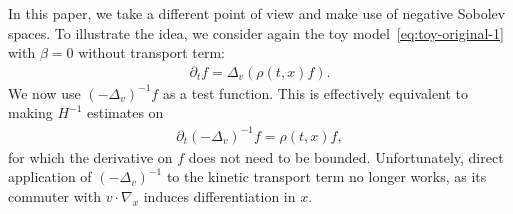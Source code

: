 \documentclass[11pt,american, reqno]{amsart}
\numberwithin{equation}{section}
\newcommand{\1}{\mathds{1}}
\newcommand{\del}{\partial}
\newcommand{\vpran}[1]{\left(#1\right)}
\numberwithin{equation}{section}
\begin{document}
In this paper, we take a different point of view and make use of negative Sobolev spaces. To illustrate the idea, we consider again the toy model~\eqref{eq:toy-original-1} with $\beta = 0$ without transport term:
\begin{align} \label{eq:toy-simp}
 \del_t f 
= \Delta_v \vpran{\rho(t, x)  f}.
\end{align}
We now use $(-\Delta_v)^{-1} f$ as a test function. This is effectively equivalent to making $H^{-1}$ estimates on 
\begin{align*} %
 \del_t (-\Delta_v)^{-1} f 
= \rho(t, x)  f,
\end{align*}
for which the derivative on $f$ does not need to be bounded. Unfortunately, direct application of $(-\Delta_v)^{-1}$ to the kinetic transport term no longer works, as its commuter with $v \cdot \nabla_x$ induces differentiation in $x$. 
\end{document}
